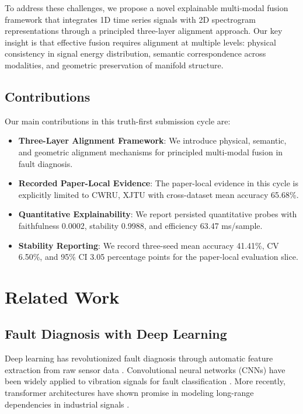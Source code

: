 \documentclass[journal]{IEEEtran}
\begin{document}
To address these challenges, we propose a novel explainable multi-modal fusion framework that integrates 1D time series signals with 2D spectrogram representations through a principled three-layer alignment approach. Our key insight is that effective fusion requires alignment at multiple levels: physical consistency in signal energy distribution, semantic correspondence across modalities, and geometric preservation of manifold structure.

\subsection{Contributions}

Our main contributions in this truth-first submission cycle are:

\begin{itemize}
\item \textbf{Three-Layer Alignment Framework}: We introduce physical, semantic, and geometric alignment mechanisms for principled multi-modal fusion in fault diagnosis.
\item \textbf{Recorded Paper-Local Evidence}: The paper-local evidence in this cycle is explicitly limited to CWRU, XJTU with cross-dataset mean accuracy 65.68\%.
\item \textbf{Quantitative Explainability}: We report persisted quantitative probes with faithfulness 0.0002, stability 0.9988, and efficiency 63.47 ms/sample.
\item \textbf{Stability Reporting}: We record three-seed mean accuracy 41.41\%, CV 6.50\%, and 95\% CI 3.05 percentage points for the paper-local evaluation slice.
\end{itemize}

\section{Related Work}

\subsection{Fault Diagnosis with Deep Learning}

Deep learning has revolutionized fault diagnosis through automatic feature extraction from raw sensor data \cite{lei2019deep}. Convolutional neural networks (CNNs) have been widely applied to vibration signals for fault classification \cite{zhang2020intelligent}. More recently, transformer architectures have shown promise in modeling long-range dependencies in industrial signals \cite{zhu2022transformer}.
\end{document}
